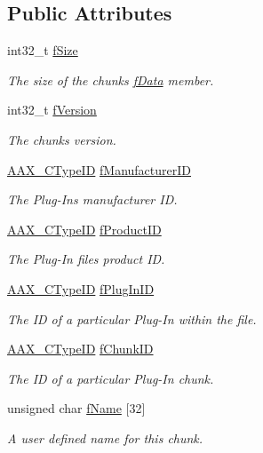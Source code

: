 \subsection*{Public Attributes}
\begin{DoxyCompactItemize}
\item 
int32\+\_\+t \mbox{\hyperlink{a01417_abaea87174a6d0dd1260644f6440591a6}{f\+Size}}
\begin{DoxyCompactList}\small\item\em The size of the chunk\textquotesingle{}s \mbox{\hyperlink{a01421_abc76d66fffa4a59ee5cfdbdd992c532c}{f\+Data}} member. \end{DoxyCompactList}\item 
int32\+\_\+t \mbox{\hyperlink{a01417_a543b3299cad8fd9a4de599d97a069a35}{f\+Version}}
\begin{DoxyCompactList}\small\item\em The chunk\textquotesingle{}s version. \end{DoxyCompactList}\item 
\mbox{\hyperlink{a00392_ac678f9c1fbcc26315d209f71a147a175}{A\+A\+X\+\_\+\+C\+Type\+ID}} \mbox{\hyperlink{a01417_a569567884784354c6be2824199ccb194}{f\+Manufacturer\+ID}}
\begin{DoxyCompactList}\small\item\em The Plug-\/\+In\textquotesingle{}s manufacturer ID. \end{DoxyCompactList}\item 
\mbox{\hyperlink{a00392_ac678f9c1fbcc26315d209f71a147a175}{A\+A\+X\+\_\+\+C\+Type\+ID}} \mbox{\hyperlink{a01417_afbed1db12ae1f7cb3204dad3fd66070e}{f\+Product\+ID}}
\begin{DoxyCompactList}\small\item\em The Plug-\/\+In file\textquotesingle{}s product ID. \end{DoxyCompactList}\item 
\mbox{\hyperlink{a00392_ac678f9c1fbcc26315d209f71a147a175}{A\+A\+X\+\_\+\+C\+Type\+ID}} \mbox{\hyperlink{a01417_a34e98621d17821659efb8ecdb4847ec5}{f\+Plug\+In\+ID}}
\begin{DoxyCompactList}\small\item\em The ID of a particular Plug-\/\+In within the file. \end{DoxyCompactList}\item 
\mbox{\hyperlink{a00392_ac678f9c1fbcc26315d209f71a147a175}{A\+A\+X\+\_\+\+C\+Type\+ID}} \mbox{\hyperlink{a01417_a01307400067d1777c304624ffb5e0a8c}{f\+Chunk\+ID}}
\begin{DoxyCompactList}\small\item\em The ID of a particular Plug-\/\+In chunk. \end{DoxyCompactList}\item 
unsigned char \mbox{\hyperlink{a01417_a84bee19fce5aeb2c429d872430cb8dab}{f\+Name}} \mbox{[}32\mbox{]}
\begin{DoxyCompactList}\small\item\em A user defined name for this chunk. \end{DoxyCompactList}\end{DoxyCompactItemize}


